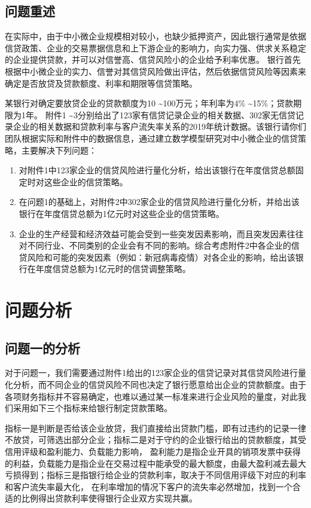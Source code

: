 \documentclass[dvipsnames,withoutpreface,bwprint]{cumcmthesis}
\begin{document}
\subsection{问题重述}
\par 在实际中，由于中小微企业规模相对较小，也缺少抵押资产，因此银行通常是依据信贷政策、企业的交易票据信息和上下游企业的影响力，向实力强、供求关系稳定的企业提供贷款，并可以对信誉高、信贷风险小的企业给予利率优惠。
银行首先根据中小微企业的实力、信誉对其信贷风险做出评估，然后依据信贷风险等因素来确定是否放贷及贷款额度、利率和期限等信贷策略。
\par 某银行对确定要放贷企业的贷款额度为10 \textasciitilde 100万元；年利率为4\% \textasciitilde 15\%；贷款期限为1年。
附件1 \textasciitilde 3分别给出了123家有信贷记录企业的相关数据、302家无信贷记录企业的相关数据和贷款利率与客户流失率关系的2019年统计数据。该银行请你们团队根据实际和附件中的数据信息，通过建立数学模型研究对中小微企业的信贷策略，主要解决下列问题：
\begin{enumerate}[fullwidth,itemindent=2em,label=(\arabic*)]
    \item 对附件1中123家企业的信贷风险进行量化分析，给出该银行在年度信贷总额固定时对这些企业的信贷策略。
    \item 在问题1的基础上，对附件2中302家企业的信贷风险进行量化分析，并给出该银行在年度信贷总额为1亿元时对这些企业的信贷策略。
    \item 企业的生产经营和经济效益可能会受到一些突发因素影响，而且突发因素往往对不同行业、不同类别的企业会有不同的影响。综合考虑附件2中各企业的信贷风险和可能的突发因素（例如：新冠病毒疫情）对各企业的影响，给出该银行在年度信贷总额为1亿元时的信贷调整策略。
\end{enumerate}
\section{问题分析}
\subsection{问题一的分析}
对于问题一，我们需要通过附件1给出的123家企业的信贷记录对其信贷风险进行量化分析，而不同企业的信贷风险不同也决定了银行愿意给出企业的贷款额度。由于各项财务指标并不容易确定，也难以通过某一标准来进行企业风险的量度，对此我们采用如下三个指标来给银行制定贷款策略。
\par 指标一是判断是否给该企业放贷，我们直接给出贷款门槛，即有过违约的记录一律不放贷，可筛选出部分企业；指标二是对于守约的企业银行给出的贷款额度，其受信用评级和盈利能力、负载能力影响，
盈利能力是指企业开具的销项发票中获得的利益，负载能力是指企业在交易过程中能承受的最大额度，由最大盈利减去最大亏损得到；指标三是指银行给企业的贷款利率，取决于不同信用评级下对应的利率和客户流失率最大化，
在利率增加的情况下客户的流失率必然增加，找到一个合适的比例得出贷款利率使得银行企业双方实现共赢。
\end{document}
